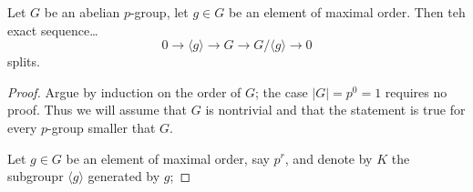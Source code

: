 \begin{lemma}
\label{sequenceabeliangroups}
Let $G$ be an abelian $p$-group, let $g \in G$ be an element of maximal order. Then teh exact sequence\dots
$$0 \rightarrow \langle g \rangle \rightarrow G \rightarrow G / \langle g \rangle \rightarrow 0$$
splits.
\end{lemma}

\begin{proof}
Argue by induction on the order of $G$; the case $|G| = p^0 = 1$ requires no proof. Thus we will assume that $G$ is nontrivial and that the statement is true for every $p$-group smaller that $G$.

Let $g \in G$ be an element of maximal order, say $p^r$, and denote by $K$ the subgroupr $\langle g \rangle$ generated by $g$;
\end{proof}